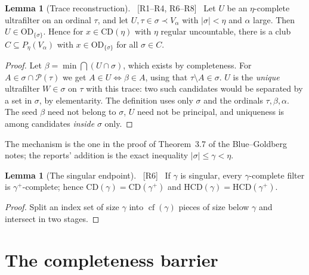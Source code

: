 \documentclass[11pt,letterpaper]{article}
\theoremstyle{definition}
\newtheorem{lemma}[definition]{Lemma}
\numberwithin{equation}{section}
\newcommand{\OD}{\mathrm{OD}}
\newcommand{\CD}{\mathrm{CD}}
\newcommand{\HCD}{\mathrm{HCD}}
\newcommand{\cf}{\operatorname{cf}}
\newcommand{\Pow}{\mathcal P}
\newcommand{\src}[1]{\unskip\ {\normalfont\small\sffamily\color{Olive}[#1]}\ }
\begin{document}
\begin{lemma}[Trace reconstruction]\label{lem:trace}\src{R1--R4, R6--R8}
Let $U$ be an $\eta$-complete ultrafilter on an ordinal $\tau$, and let $U,\tau\in\sigma\prec V_\alpha$ with $|\sigma|<\eta$ and $\alpha$ large. Then $U\in\OD_{\{\sigma\}}$. Hence for $x\in\CD(\eta)$ with $\eta$ regular uncountable, there is a club $C\subseteq P_\eta(V_\alpha)$ with $x\in\OD_{\{\sigma\}}$ for all $\sigma\in C$.
\end{lemma}

\begin{proof}
Let $\beta=\min\bigcap(U\cap\sigma)$, which exists by completeness. For $A\in\sigma\cap\Pow(\tau)$ we get $A\in U\iff\beta\in A$, using that $\tau\setminus A\in\sigma$. $U$ is the \emph{unique} ultrafilter $W\in\sigma$ on $\tau$ with this trace: two such candidates would be separated by a set in $\sigma$, by elementarity. The definition uses only $\sigma$ and the ordinals $\tau,\beta,\alpha$. The seed $\beta$ need not belong to $\sigma$, $U$ need not be principal, and uniqueness is among candidates \emph{inside} $\sigma$ only.
\end{proof}

The mechanism is the one in the proof of Theorem~3.7 of the Blue--Goldberg notes; the reports' addition is the exact inequality $|\sigma|\le\gamma<\eta$.

\begin{lemma}[The singular endpoint]\label{lem:singular}\src{R6}
If $\gamma$ is singular, every $\gamma$-complete filter is $\gamma^+$-complete; hence $\CD(\gamma)=\CD(\gamma^+)$ and $\HCD(\gamma)=\HCD(\gamma^+)$.
\end{lemma}

\begin{proof}
Split an index set of size $\gamma$ into $\cf(\gamma)$ pieces of size below $\gamma$ and intersect in two stages.
\end{proof}

\section{The completeness barrier}\label{sec:barrier}
\end{document}
